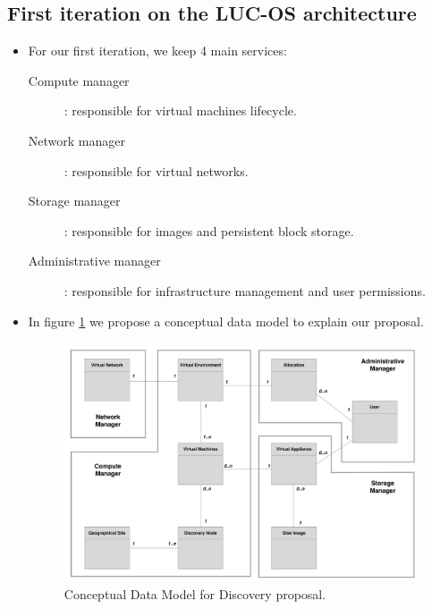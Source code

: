 \subsection{First iteration on the LUC-OS architecture}

\begin{itemize}

	\item For our first iteration, we keep 4 main services:
		\begin{description}

			\item [Compute manager] : responsible for virtual machines lifecycle.

			\item [Network manager] : responsible for virtual networks.

			\item [Storage manager] : responsible for images and persistent block storage.

			\item [Administrative manager] : responsible for infrastructure management and user permissions.  

		\end{description}


	\item In figure \ref{fig:mcd} we propose a conceptual data model to explain our proposal.


	\begin{figure}
		\centering
		\includegraphics[width=0.91\linewidth]{Figures/mcd_3.pdf}
		\caption{Conceptual Data Model for Discovery proposal.}%
		\label{fig:mcd}%
	\end{figure}


\end{itemize}
